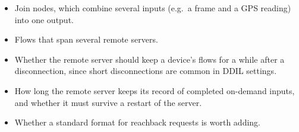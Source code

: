 \documentclass[11pt]{article}
\begin{document}
\begin{itemize}[nosep]
        inputs a server delivers to an engine before their outcomes arrive.
        Both are constants, because iceoryx2 fixes record and buffer sizes
        when a service is created, and flows come and go at runtime. Their
        values are guesses to tune by measurement.
  \item Join nodes, which combine several inputs (e.g.\ a frame and a GPS
        reading) into one output.
  \item Flows that span several remote servers.
  \item Whether the remote server should keep a device's flows for a while
        after a disconnection, since short disconnections are common in DDIL
        settings.
  \item How long the remote server keeps its record of completed on-demand
        inputs, and whether it must survive a restart of the server.
  \item Whether a standard format for reachback requests is worth adding.
\end{itemize}
\end{document}
